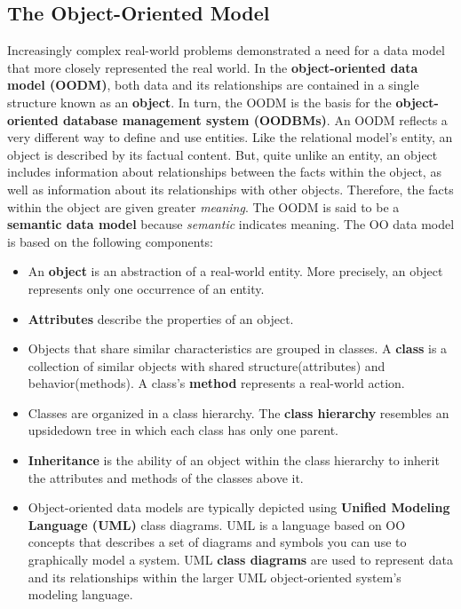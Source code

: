 \documentclass[a4paper, 12pt, titlepage]{report}
\begin{document}
\subsection{The Object-Oriented Model}
Increasingly complex real-world problems demonstrated a need for a data model that more closely represented the real world. In the \textbf{object-oriented data model (OODM)}, both data and its relationships are contained in a single structure known as an \textbf{object}. In turn, the OODM is the basis for the \textbf{object-oriented database management system (OODBMs)}. An OODM reflects a very different way to define and use entities. Like the relational model’s entity, an object is described by its factual content. But, quite unlike an entity, an object includes information about relationships between the facts within the object, as well as information about its relationships with other objects. Therefore, the facts within the object are given greater \emph{meaning}. The OODM is said to be a \textbf{semantic data model} because \emph{semantic} indicates meaning.
The OO data model is based on the following components:
\begin{itemize}
\item An \textbf{object} is an abstraction of a real-world entity. More precisely, an object represents only one occurrence of an entity.
\item \textbf{Attributes} describe the properties of an object.
\item Objects that share similar characteristics are grouped in classes. A \textbf{class} is a collection of similar objects with shared structure(attributes) and behavior(methods). A class’s \textbf{method} represents a real-world action.
\item Classes are organized in a class hierarchy. The \textbf{class hierarchy} resembles an upsidedown tree in which each class has only one parent.
\item \textbf{Inheritance} is the ability of an object within the class hierarchy to inherit the attributes and methods of the classes above it.
\item Object-oriented data models are typically depicted using \textbf{Unified Modeling Language (UML)} class diagrams. UML is a language based on OO concepts that describes a set of diagrams and symbols you can use to graphically model a system. UML \textbf{class diagrams} are used to represent data and its relationships within the larger UML object-oriented system’s modeling language.
\end{itemize}
\end{document}
